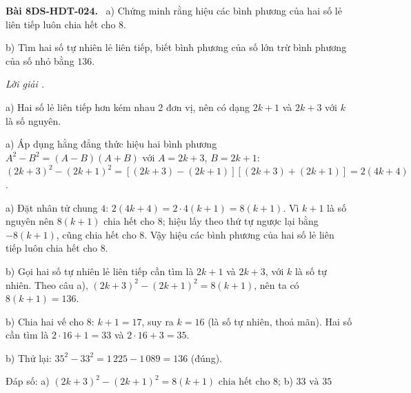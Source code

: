\documentclass[12pt,a4paper]{article}
\newenvironment{problem}[1][]{\par\medskip\noindent\textbf{Bài #1.}\ }{\par}
\newenvironment{solution}[1][]{\par\noindent\textit{Lời giải #1.}\par}{\par}
\begin{document}
\begin{problem}[8DS-HDT-024]
a) Chứng minh rằng hiệu các bình phương của hai số lẻ liên tiếp luôn chia hết cho $8$.

b) Tìm hai số tự nhiên lẻ liên tiếp, biết bình phương của số lớn trừ bình phương của số nhỏ bằng $136$.

\begin{solution}
a) Hai số lẻ liên tiếp hơn kém nhau $2$ đơn vị, nên có dạng $2k + 1$ và $2k + 3$ với $k$ là số nguyên.

a) Áp dụng hằng đẳng thức hiệu hai bình phương $A^2 - B^2 = (A - B)(A + B)$ với $A = 2k + 3$, $B = 2k + 1$: $(2k + 3)^2 - (2k + 1)^2 = \left[(2k + 3) - (2k + 1)\right]\left[(2k + 3) + (2k + 1)\right] = 2(4k + 4)$.

a) Đặt nhân tử chung $4$: $2(4k + 4) = 2 \cdot 4(k + 1) = 8(k + 1)$. Vì $k + 1$ là số nguyên nên $8(k + 1)$ chia hết cho $8$; hiệu lấy theo thứ tự ngược lại bằng $-8(k + 1)$, cũng chia hết cho $8$. Vậy hiệu các bình phương của hai số lẻ liên tiếp luôn chia hết cho $8$.

b) Gọi hai số tự nhiên lẻ liên tiếp cần tìm là $2k + 1$ và $2k + 3$, với $k$ là số tự nhiên. Theo câu a), $(2k + 3)^2 - (2k + 1)^2 = 8(k + 1)$, nên ta có $8(k + 1) = 136$.

b) Chia hai vế cho $8$: $k + 1 = 17$, suy ra $k = 16$ (là số tự nhiên, thoả mãn). Hai số cần tìm là $2 \cdot 16 + 1 = 33$ và $2 \cdot 16 + 3 = 35$.

b) Thử lại: $35^2 - 33^2 = 1\,225 - 1\,089 = 136$ (đúng).

Đáp số: a) $\boxed{(2k + 3)^2 - (2k + 1)^2 = 8(k + 1) \text{ chia hết cho } 8}$; b) $\boxed{33 \text{ và } 35}$
\end{solution}
\end{problem}
\end{document}
